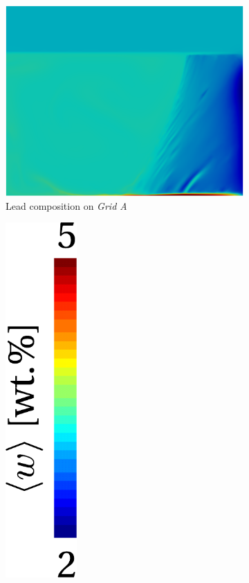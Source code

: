 \begin{figure}[htbp]
\centering
  \begin{subfigure}[t]{0.4\textwidth}
    \centering
  \includegraphics[width=\textwidth]{Chapter5/Graphics/2d/1200s_compo.png}
  \caption{Lead composition on \emph{Grid A}}
    \label{fig:1200s_compo}
  \end{subfigure}
  \begin{subfigure}[t]{0.15\textwidth}
    \centering
  \includegraphics[width=0.3\textwidth]{Chapter5/Graphics/2d/colorbar.pdf}

\end{subfigure}
\end{figure}
